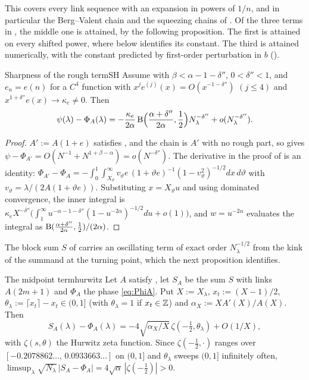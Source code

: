 This covers every link sequence with an expansion in powers of $1/n$, and in particular
the Berg--Valent chain and the squeezing chains of . Of the three terms
in , the middle one is attained, by the following proposition. The first
is attained on every shifted power, where  below identifies its
constant. The third is attained numerically, with the constant predicted by first-order
perturbation in $b$ ().

\begin{proposition}{Sharpness of the rough term}{SH}
Assume  with $\beta<\alpha-1-\delta''$, $0<\delta''<1$, and $e_n=e(n)$ for a $C^4$ function
with $x^je^{(j)}(x)=O(x^{-1-\delta''})$ $(j\le4)$ and $x^{1+\delta''}e(x)\to\kappa_e\ne0$. Then
\[
  \psi(\lambda)-\Phi_A(\lambda)=-\frac{\kappa_e}{2\alpha}\operatorname{B}\Bigl(\frac{\alpha+\delta''}{2\alpha},\frac12\Bigr)N_\lambda^{-\delta''}+o(N_\lambda^{-\delta''}).
\]
\end{proposition}

\begin{proof}
$A':=A(1+e)$ satisfies , and the chain is $A'$ with no rough part, so
 gives $\psi-\Phi_{A'}=O(N^{-1}+N^{1+\beta-\alpha})=o(N^{-\delta''})$. The derivative in
the proof of  is an identity:
$\Phi_{A'}-\Phi_A=-\int_0^1\int_{X_\vartheta}^\infty v_\vartheta e\,(1+\vartheta e)^{-1}(1-v_\vartheta^2)^{-1/2}dx\,d\vartheta$ with
$v_\vartheta=\lambda/(2A(1+\vartheta e))$. Substituting $x=X_\vartheta u$ and using dominated convergence,
the inner integral is $\kappa_eX^{-\delta''}\bigl(\int_1^\infty u^{-\alpha-1-\delta''}(1-u^{-2\alpha})^{-1/2}du+o(1)\bigr)$,
and $w=u^{-2\alpha}$ evaluates the integral as $\operatorname{B}(\frac{\alpha+\delta''}{2\alpha},\frac12)/(2\alpha)$.
\end{proof}

The block sum $S$ of  carries an
oscillating term of exact order $N_\lambda^{-1/2}$ from the kink of the summand at the turning
point, which the next proposition identifies.

\begin{proposition}{The midpoint term}{hurwitz}
Let $A$ satisfy , let $S_A$ be the sum $S$ with links $A(2m+1)$ and
$\Phi_A$ the phase \eqref{eq:PhiA}. Put $X:=X_\lambda$, $x_t:=(X-1)/2$,
$\theta_\lambda:=\lceil x_t\rceil-x_t\in(0,1]$ (with $\theta_\lambda=1$ if $x_t\in\mathbb{Z}$) and
$\alpha_X:=XA'(X)/A(X)$. Then
\[
  S_A(\lambda)-\Phi_A(\lambda)=-4\sqrt{\alpha_X/X}\,\zeta(-\tfrac12,\theta_\lambda)+O(1/X),
\]
with $\zeta(s,\theta)$ the Hurwitz zeta function. Since $\zeta(-\frac12,\cdot)$ ranges over
$[-0.2078862\ldots,\allowbreak\,0.0933663\ldots]$ on $(0,1]$ and $\theta_\lambda$ sweeps $(0,1]$ infinitely
often, $\limsup_{\lambda}\sqrt{N_\lambda}\,|S_A-\Phi_A|=4\sqrt\alpha\,|\zeta(-\frac12)|>0$.
\end{proposition}

